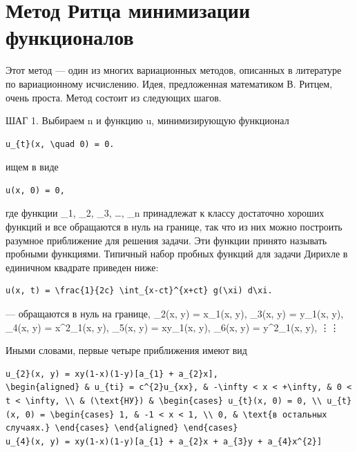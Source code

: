 \documentclass[
  ukrainian,
]{article}
\begin{document}
\section{Метод Ритца минимизации
функционалов}\label{ux43cux435ux442ux43eux434-ux440ux438ux442ux446ux430-ux43cux438ux43dux438ux43cux438ux437ux430ux446ux438ux438-ux444ux443ux43dux43aux446ux438ux43eux43dux430ux43bux43eux432}

Этот метод --- один из многих вариационных методов, описанных в
литературе по вариационному исчислению. Идея, предложенная математиком
В. Ритцем, очень проста. Метод состоит из следующих шагов.

ШАГ 1. Выбираем n и функцию u, минимизирующую функционал

\begin{verbatim}
u_{t}(x, \quad 0) = 0.
\end{verbatim}

ищем в виде

\begin{verbatim}
u(x, 0) = 0,
\end{verbatim}

где функции \phi\_1, \phi\_2, \phi\_3, \ldots, \phi\_n принадлежат к
классу достаточно хороших функций и все обращаются в нуль на границе,
так что из них можно построить разумное приближение для решения задачи.
Эти функции принято называть пробными функциями. Типичный набор пробных
функций для задачи Дирихле в единичном квадрате приведен ниже:

\begin{verbatim}
u(x, t) = \frac{1}{2c} \int_{x-ct}^{x+ct} g(\xi) d\xi.
\end{verbatim}

--- обращаются в нуль на границе, \varphi\_2(x, y) = x\varphi\_1(x, y),
\varphi\_3(x, y) = y\varphi\_1(x, y), \varphi\_4(x, y) =
x\^{}2\varphi\_1(x, y), \varphi\_5(x, y) = xy\varphi\_1(x, y),
\varphi\_6(x, y) = y\^{}2\varphi\_1(x, y), \vdots     \vdots

Иными словами, первые четыре приближения имеют вид

\begin{verbatim}
u_{2}(x, y) = xy(1-x)(1-y)[a_{1} + a_{2}x],
\begin{aligned} & u_{ti} = c^{2}u_{xx}, & -\infty < x < +\infty, & 0 < t < \infty, \\ & (\text{НУ}) & \begin{cases} u_{t}(x, 0) = 0, \\ u_{t}(x, 0) = \begin{cases} 1, & -1 < x < 1, \\ 0, & \text{в остальных случаях.} \end{cases} \end{aligned} \end{cases}
u_{4}(x, y) = xy(1-x)(1-y)[a_{1} + a_{2}x + a_{3}y + a_{4}x^{2}]
\end{verbatim}
\end{document}
